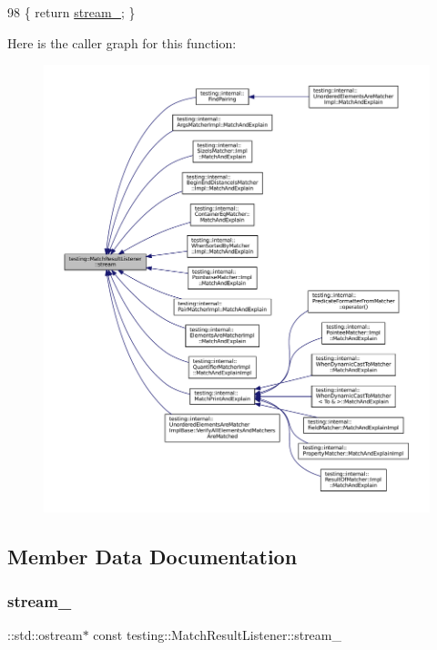 \begin{DoxyCode}
98 \{ \textcolor{keywordflow}{return} \hyperlink{classtesting_1_1MatchResultListener_a91ff831a7e848af58d44eb3b1801812c}{stream\_}; \}
\end{DoxyCode}
Here is the caller graph for this function\+:
\nopagebreak
\begin{figure}[H]
\begin{center}
\leavevmode
\includegraphics[width=350pt]{classtesting_1_1MatchResultListener_a5abecb247e005f7f50a94898e3f44ee3_icgraph}
\end{center}
\end{figure}


\subsection{Member Data Documentation}
\mbox{\label{classtesting_1_1MatchResultListener_a91ff831a7e848af58d44eb3b1801812c}} 
\subsubsection{\texorpdfstring{stream\+\_\+}{stream\_}}
{\footnotesize\ttfamily \+::std\+::ostream$\ast$ const testing\+::\+Match\+Result\+Listener\+::stream\+\_\+\hspace{0.3cm}{\ttfamily [private]}}




